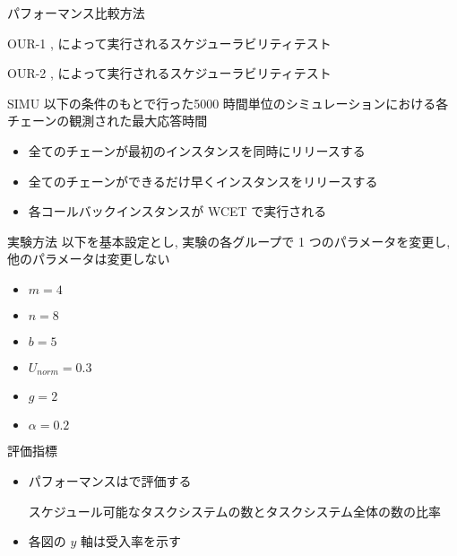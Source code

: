 \begin{frame}{パフォーマンス比較方法}
    \vspace{1mm}
    \begin{block}{OUR-1}
        ,  によって実行されるスケジューラビリティテスト
    \end{block}
    \begin{block}{OUR-2}
        ,  によって実行されるスケジューラビリティテスト
    \end{block}
    \begin{block}{SIMU}
        以下の条件のもとで行った5000 時間単位のシミュレーションにおける各チェーンの観測された最大応答時間
        \setlength{\linewidth}{0.98\columnwidth}
        \footnotesize
        \begin{itemize}
            \item 全てのチェーンが最初のインスタンスを同時にリリースする
            \item 全てのチェーンができるだけ早くインスタンスをリリースする
            \item 各コールバックインスタンスが WCET で実行される
        \end{itemize}
    \end{block}
\end{frame}

\begin{frame}{実験方法}
    以下を基本設定とし, 実験の各グループで 1 つのパラメータを変更し, 他のパラメータは変更しない
    \begin{itemize}
        \item $m=4$
        \item $n=8$
        \item $b=5$
        \item $U_{n o r m}=0.3$
        \item $g=2$
        \item $\alpha=0.2$
    \end{itemize}
\end{frame}

\begin{frame}{評価指標}
    \begin{itemize}
        \item パフォーマンスはで評価する
              \begin{definition}[受入率]
                  スケジュール可能なタスクシステムの数とタスクシステム全体の数の比率
              \end{definition}
              \vspace{5mm}
        \item 各図の $y$ 軸は受入率を示す
    \end{itemize}
\end{frame}

